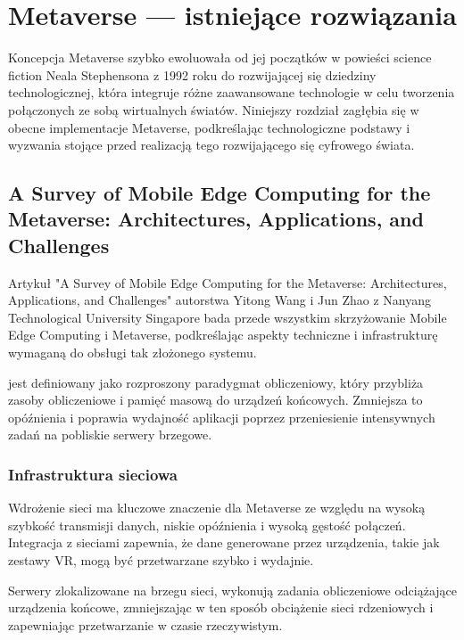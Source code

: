 \chapter{Metaverse --- istniejące rozwiązania}

Koncepcja Metaverse szybko ewoluowała od jej początków w powieści science fiction Neala Stephensona  z 1992 roku do rozwijającej się dziedziny technologicznej, która integruje różne zaawansowane technologie w celu tworzenia połączonych ze sobą wirtualnych światów. Niniejszy rozdział zagłębia się w obecne implementacje Metaverse, podkreślając technologiczne podstawy i wyzwania stojące przed realizacją tego rozwijającego się cyfrowego świata.

\section{A Survey of Mobile Edge Computing for the
Metaverse: Architectures, Applications, and
Challenges}

Artykuł "A Survey of Mobile Edge Computing for the Metaverse: Architectures, Applications, and Challenges" autorstwa Yitong Wang i Jun Zhao z Nanyang Technological University Singapore bada przede wszystkim skrzyżowanie Mobile Edge Computing  i Metaverse, podkreślając aspekty techniczne i infrastrukturę wymaganą do obsługi tak złożonego systemu.

 jest definiowany jako rozproszony paradygmat obliczeniowy, który przybliża zasoby obliczeniowe i pamięć masową do urządzeń końcowych. Zmniejsza to opóźnienia i poprawia wydajność aplikacji poprzez przeniesienie intensywnych zadań na pobliskie serwery brzegowe.

\subsection{Infrastruktura sieciowa}

Wdrożenie sieci  ma kluczowe znaczenie dla Metaverse ze względu na wysoką szybkość transmisji danych, niskie opóźnienia i wysoką gęstość połączeń. Integracja  z sieciami  zapewnia, że dane generowane przez urządzenia, takie jak zestawy VR, mogą być przetwarzane szybko i wydajnie.

Serwery zlokalizowane na brzegu sieci, wykonują zadania obliczeniowe odciążające urządzenia końcowe, zmniejszając w ten sposób obciążenie sieci rdzeniowych i zapewniając przetwarzanie w czasie rzeczywistym.

